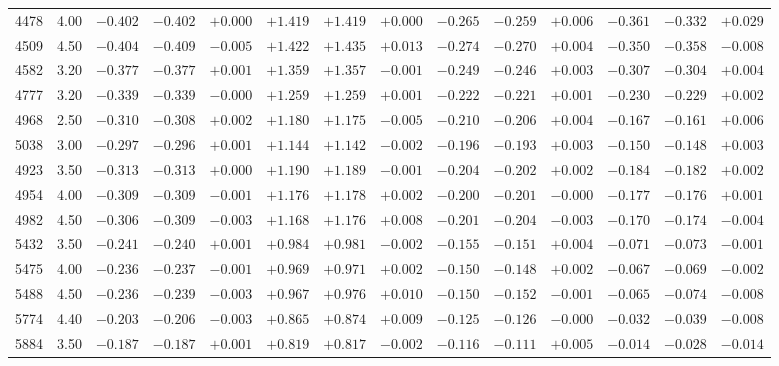 \documentclass[]{aa}
\begin{document}
\begin{appendix}
\begin{table*}
\begin{center}
\begin{tabular}{llllllllllllll}
4478  &4.00 & $-0.402$ &$ -0.402$ &$ +0.000$ &$ +1.419$ &$ +1.419$ &$ +0.000$ &$ -0.265$ &$ -0.259$  &$+0.006$ &$ -0.361$ &$ -0.332$&$  +0.029$ \\
4509  &4.50 & $-0.404$ &$ -0.409$ &$ -0.005$ &$ +1.422$ &$ +1.435$ &$ +0.013$ &$ -0.274$ &$ -0.270$  &$+0.004$ &$ -0.350$ &$ -0.358$&$  -0.008$ \\
4582  &3.20 & $-0.377$ &$ -0.377$ &$ +0.001$ &$ +1.359$ &$ +1.357$ &$ -0.001$ &$ -0.249$ &$ -0.246$  &$+0.003$ &$ -0.307$ &$ -0.304$&$  +0.004$ \\
4777  &3.20 & $-0.339$ &$ -0.339$ &$ -0.000$ &$ +1.259$ &$ +1.259$ &$ +0.001$ &$ -0.222$ &$ -0.221$  &$+0.001$ &$ -0.230$ &$ -0.229$&$  +0.002$ \\
4968  &2.50 & $-0.310$ &$ -0.308$ &$ +0.002$ &$ +1.180$ &$ +1.175$ &$ -0.005$ &$ -0.210$ &$ -0.206$  &$+0.004$ &$ -0.167$ &$ -0.161$&$  +0.006$ \\
5038  &3.00 & $-0.297$ &$ -0.296$ &$ +0.001$ &$ +1.144$ &$ +1.142$ &$ -0.002$ &$ -0.196$ &$ -0.193$  &$+0.003$ &$ -0.150$ &$ -0.148$&$  +0.003$ \\
4923  &3.50 & $-0.313$ &$ -0.313$ &$ +0.000$ &$ +1.190$ &$ +1.189$ &$ -0.001$ &$ -0.204$ &$ -0.202$  &$+0.002$ &$ -0.184$ &$ -0.182$&$  +0.002$ \\
4954  &4.00 & $-0.309$ &$ -0.309$ &$ -0.001$ &$ +1.176$ &$ +1.178$ &$ +0.002$ &$ -0.200$ &$ -0.201$  &$-0.000$ &$ -0.177$ &$ -0.176$&$  +0.001$ \\
4982  &4.50 & $-0.306$ &$ -0.309$ &$ -0.003$ &$ +1.168$ &$ +1.176$ &$ +0.008$ &$ -0.201$ &$ -0.204$  &$-0.003$ &$ -0.170$ &$ -0.174$&$  -0.004$ \\
5432  &3.50 & $-0.241$ &$ -0.240$ &$ +0.001$ &$ +0.984$ &$ +0.981$ &$ -0.002$ &$ -0.155$ &$ -0.151$  &$+0.004$ &$ -0.071$ &$ -0.073$&$  -0.001$ \\
5475  &4.00 & $-0.236$ &$ -0.237$ &$ -0.001$ &$ +0.969$ &$ +0.971$ &$ +0.002$ &$ -0.150$ &$ -0.148$  &$+0.002$ &$ -0.067$ &$ -0.069$&$  -0.002$ \\
5488  &4.50 & $-0.236$ &$ -0.239$ &$ -0.003$ &$ +0.967$ &$ +0.976$ &$ +0.010$ &$ -0.150$ &$ -0.152$  &$-0.001$ &$ -0.065$ &$ -0.074$&$  -0.008$ \\
5774  &4.40 & $-0.203$ &$ -0.206$ &$ -0.003$ &$ +0.865$ &$ +0.874$ &$ +0.009$ &$ -0.125$ &$ -0.126$  &$-0.000$ &$ -0.032$ &$ -0.039$&$  -0.008$ \\
5884  &3.50 & $-0.187$ &$ -0.187$ &$ +0.001$ &$ +0.819$ &$ +0.817$ &$ -0.002$ &$ -0.116$ &$ -0.111$  &$+0.005$ &$ -0.014$ &$ -0.028$&$  -0.014$ \\

\end{tabular}
\end{center}
\end{table*}
\end{appendix}
\end{document}
